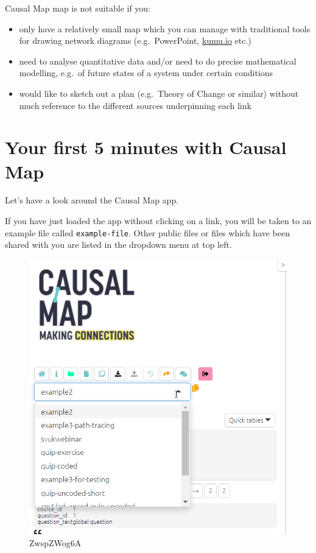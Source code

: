\documentclass[
]{book}
\providecommand{\tightlist}{%
  \setlength{\itemsep}{0pt}\setlength{\parskip}{0pt}}
\begin{document}
Causal Map map is not suitable if you:

\begin{itemize}
\tightlist
\item
  only have a relatively small map which you can manage with traditional tools for drawing network diagrams (e.g.~PowerPoint, \href{http://kumu.io}{kumu.io} etc.)
\item
  need to analyse quantitative data and/or need to do precise mathematical modelling, e.g.~of future states of a system under certain conditions
\item
  would like to sketch out a plan (e.g.~Theory of Change or similar) without much reference to the different sources underpinning each link
\end{itemize}

\hypertarget{x5}{%
\chapter{Your first 5 minutes with Causal Map}\label{x5}}

Let's have a look around the Causal Map app.

If you have just loaded the app without clicking on a link, you will be taken to an example file called \texttt{example-file}. Other public files or files which have been shared with you are listed in the dropdown menu at top left.

\begin{figure}
\centering
\includegraphics[width=6.77083in,height=\textheight]{_assets/ZwspZWog6A.gif}
\caption{ZwspZWog6A}
\end{figure}
\end{document}
